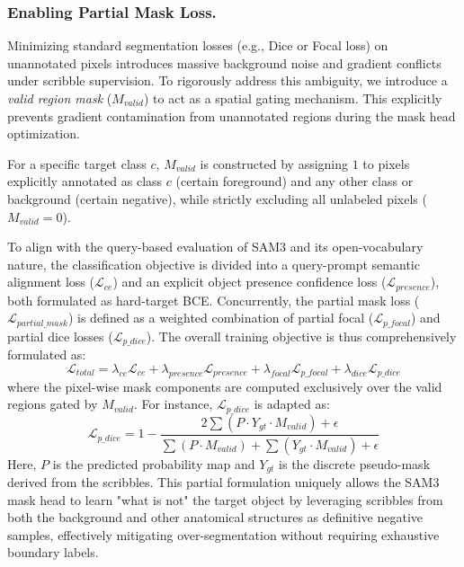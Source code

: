 \documentclass[runningheads]{llncs}
\begin{document}
\subsubsection{Enabling Partial Mask Loss.}
Minimizing standard segmentation losses (e.g., Dice or Focal loss) on unannotated pixels introduces massive background noise and gradient conflicts under scribble supervision. 
To rigorously address this ambiguity, we introduce a \textit{valid region mask} ($M_{valid}$) to act as a spatial gating mechanism. This explicitly prevents gradient contamination from unannotated regions during the mask head optimization.

For a specific target class $c$, $M_{valid}$ is constructed by assigning $1$ to pixels explicitly annotated as class $c$ (certain foreground) and any other class or background (certain negative), while strictly excluding all unlabeled pixels ($M_{valid}=0$). 

To align with the query-based evaluation of SAM3 and its open-vocabulary nature, the classification objective is divided into a query-prompt semantic alignment loss ($\mathcal{L}_{ce}$) and an explicit object presence confidence loss ($\mathcal{L}_{presence}$), both formulated as hard-target BCE.
Concurrently, the partial mask loss ($\mathcal{L}_{partial\_mask}$) is defined as a weighted combination of partial focal ($\mathcal{L}_{p\_focal}$) and partial dice losses ($\mathcal{L}_{p\_dice}$). The overall training objective is thus comprehensively formulated as:
\begin{equation}
    \mathcal{L}_{total} = \lambda_{ce} \mathcal{L}_{ce} + \lambda_{presence} \mathcal{L}_{presence} + \lambda_{focal} \mathcal{L}_{p\_focal} + \lambda_{dice} \mathcal{L}_{p\_dice}
\end{equation}
where the pixel-wise mask components are computed exclusively over the valid regions gated by $M_{valid}$. For instance, $\mathcal{L}_{p\_dice}$ is adapted as:
\begin{equation}
    \mathcal{L}_{p\_dice} = 1 - \frac{2 \sum (P \cdot Y_{gt} \cdot M_{valid}) + \epsilon}{\sum (P \cdot M_{valid}) + \sum (Y_{gt} \cdot M_{valid}) + \epsilon}
\end{equation}
Here, $P$ is the predicted probability map and $Y_{gt}$ is the discrete pseudo-mask derived from the scribbles. This partial formulation uniquely allows the SAM3 mask head to learn "what is not" the target object by leveraging scribbles from both the background and other anatomical structures as definitive negative samples, effectively mitigating over-segmentation without requiring exhaustive boundary labels.
\end{document}
